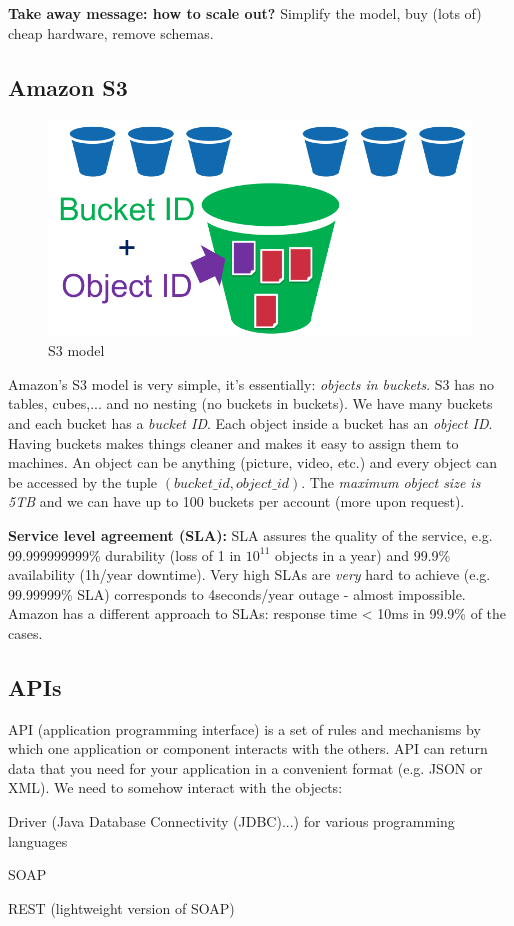 \documentclass[11pt,oneside,a4paper]{article}
\begin{document}
\textbf{Take away message: how to scale out?} Simplify the model, buy (lots of) cheap hardware, remove schemas.

\newpage

\subsection{Amazon S3}

\begin{figure}
	\centering
	\includegraphics[width=0.2\linewidth]{figures/s3_buckets}
	\caption{S3 model}
	\label{fig:s3buckets}
\end{figure}

Amazon's S3 model is very simple, it's essentially: \textit{objects in buckets}. S3 has no tables, cubes,... and no nesting (no buckets in buckets). We have many buckets and each bucket has a \textit{bucket ID}. Each object inside a bucket has an \textit{object ID}. Having buckets makes things cleaner and makes it easy to assign them to machines. An object can be anything (picture, video, etc.) and every object can be accessed by the tuple $(bucket\_id, object\_id)$. The \textit{maximum object size is 5TB} and we can have up to 100 buckets per account (more upon request).

\textbf{Service level agreement (SLA):} SLA assures the quality of the service, e.g. 99.999999999\% durability (loss of 1 in $10^11$ objects in a year) and 99.9\% availability (1h/year downtime). Very high SLAs are \textit{very} hard to achieve (e.g. 99.99999\% SLA) corresponds to 4seconds/year outage - almost impossible. Amazon has a different approach to SLAs: response time < 10ms in 99.9\% of the cases.

\subsection{APIs}

API (application programming interface) is a set of rules and mechanisms by which one application or component interacts with the others. API can return data that you need for your application in a convenient format (e.g. JSON or XML). We need to somehow interact with the objects:

\begin{compactitem}
	\item Driver (Java Database Connectivity (JDBC)...) for various programming languages
	\item SOAP
	\item REST (lightweight version of SOAP)\\
\end{compactitem}
\end{document}
